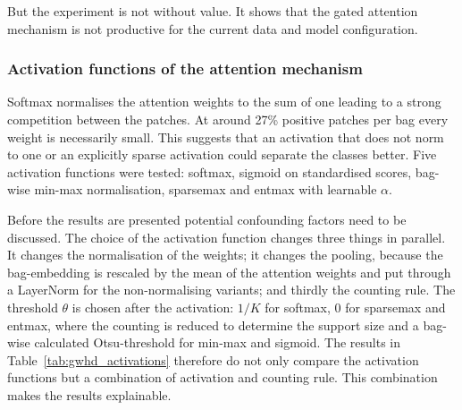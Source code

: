 \documentclass[12pt,parskip = half, DIV=classic,listof=totoc]{scrartcl}
\begin{document}
			But the experiment is not without value. It shows that the gated attention mechanism is not productive for the current data and model configuration.

			\subsubsection{Activation functions of the attention mechanism}\label{sec:gwhd_activations}
			Softmax normalises the attention weights to the sum of one leading to a strong competition between the patches. At around 27\% positive patches per bag
			every weight is necessarily small. This suggests that an activation that does not norm to one or an explicitly sparse activation
			could separate the classes better. Five activation functions were tested: softmax, sigmoid on standardised scores, bag-wise min-max normalisation,
			sparsemax and entmax with learnable $\alpha$. 

			Before the results are presented potential confounding factors need to be discussed. The choice of the activation function changes three things
			in parallel. It changes the normalisation of the weights; it changes the pooling, because the bag-embedding is rescaled by the mean of the 
			attention weights and put through a LayerNorm for the non-normalising variants; and thirdly the counting rule. The threshold $\theta$ is chosen
			after the activation: $1/K$ for softmax, 0 for sparsemax and entmax, where the counting is reduced to determine the support size and a 
			bag-wise calculated Otsu-threshold for min-max and sigmoid. The results in Table~\ref{tab:gwhd_activations} therefore do not only
			compare the activation functions but a combination of activation and counting rule. This combination makes the results 
			explainable. 
\end{document}
